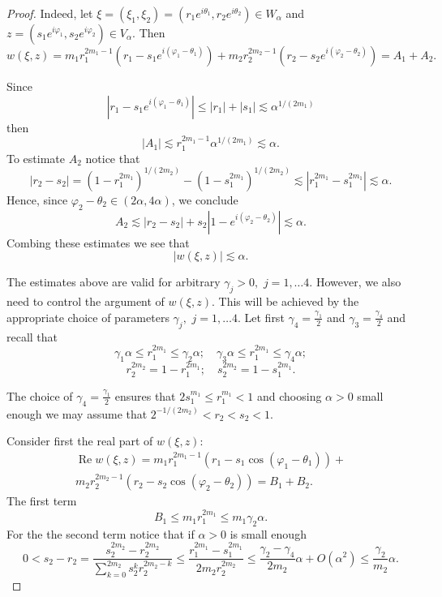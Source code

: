 \documentclass[review]{elsarticle}
\newcommand{\abs}[1]{\left\vert #1 \right\vert}
\newcommand{\RE}{ \mathop{\mathrm{Re}} }
\begin{document}
\begin{proof} 
	Indeed, let $\xi=(\xi_1,\xi_2) =(r_1e^{i\theta_1},r_2e^{i\theta_2}) \in W_\alpha$ and $z = (s_1e^{i\varphi_1},s_2e^{i\varphi_2}) \in V_\alpha$. Then
	$$w(\xi,z) = m_1r_1^{2m_1-1}\left(r_1-s_1e^{i(\varphi_1-\theta_1)}\right) + m_2r_2^{2m_2-1}\left(r_2-s_2e^{i(\varphi_2-\theta_2)}\right)  =  A_1 + A_2.$$
	
	Since
	$$\abs{ r_1-s_1e^{i(\varphi_1-\theta_1)} }\leq \abs{r_1}+\abs{s_1} \lesssim \alpha^{1/(2m_1)}
	$$
	then
	$$\abs{A_1}\lesssim r_1^{2m_1-1}\alpha^{1/(2m_1)} \lesssim \alpha.$$
	To estimate $A_2$ notice that
	$$\abs{r_2-s_2}=(1-r_1^{2m_1})^{1/(2m_2)} - (1-s_1^{2m_1})^{1/(2m_2)} \lesssim \abs{ r_1^{2m_1} -s_1^{2m_1} } \lesssim \alpha.$$
	Hence, since $\varphi_2-\theta_2\in (2\alpha,4\alpha)$, we conclude 
	$$A_2 \lesssim \abs{r_2-s_2}+s_2\abs{1-e^{i(\varphi_2-\theta_2)} }\lesssim \alpha.$$
	Combing these estimates we see that 
	$$\abs{w(\xi,z)} \lesssim \alpha.$$
	
	The estimates above are valid for arbitrary $\gamma_j>0,$ $j=1,\ldots4.$ However, we also need to control the argument of $w(\xi,z).$ This will be achieved by the appropriate choice of parameters $\gamma_j,$ $j=1,\ldots4.$ Let first $\gamma_4=\frac{\gamma_1}{2}$ and $\gamma_{3} =\frac{\gamma_{4}}{2}$ and recall that
	$$ \gamma_1\alpha \leq r_1^{2m_1} \leq \gamma_2\alpha; \quad  \gamma_3\alpha \leq r_1^{2m_1} \leq \gamma_4\alpha ;$$
	$$r_2^{2m_2} = 1-r_1^{2m_1};\quad s_2^{2m_2} =  1-s_1^{2m_1}.$$

	
	The choice of $\gamma_4=\frac{\gamma_1}{2}$ ensures that $2s_1^{m_1}\leq  r_1^{m_1}<1$ and choosing $\alpha>0$ small enough we may assume that $2^{-1/(2m_2)}<r_2<s_2< 1.$
	
	
	Consider first the real part of $w(\xi,z)$:
	\begin{multline} \label{lm:EstOfKernel_REw}
		\RE w(\xi,z) = m_1 r_1^{2m_1-1} \left(r_1-s_1\cos(\varphi_1-\theta_1)\right)+\\
		m_2 r_2^{2m_2-1} \left(r_2-s_2\cos(\varphi_2-\theta_2)\right) = B_1+B_2.
	\end{multline}
	The first term 
	$$B_1\leq m_1 r_1^{2m_1} \leq m_1 \gamma_2 \alpha.$$
	For the the second term notice that if $\alpha>0$ is small enough
	\begin{equation} \label{eq2}
		0<s_2-r_2= \frac{ s_2^{2m_2}-r_2^{2m_2} }{ \sum\limits_{k=0}^{2m_2} s_2^k r_2^{2m_2-k} } \leq 
		\frac{ r_1^{2m_1} - s_1^{2m_1} }{ 2m_2 r_2^{2m_2} } \leq \frac{ \gamma_2 -\gamma_4 }{ 2 m_2 }  \alpha + O(\alpha^2)
		\leq\frac{ \gamma_2 }{ m_2 } \alpha.
	\end{equation}
	

\end{proof}
\end{document}
